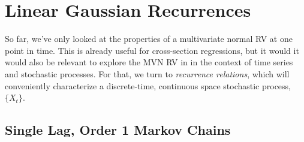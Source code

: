 \documentclass[12pt]{article}
\theoremstyle{plain}
\theoremstyle{definition}
\theoremstyle{remark}
\begin{document}





\section{Linear Gaussian Recurrences}

So far, we've only looked at the properties of a multivariate
normal RV at one point in time. This is already useful for
cross-section regressions, but it would
it would also be relevant to explore
the MVN RV in in the context of time series and stochastic
processes. For that, we turn
to \emph{recurrence relations}, which will conveniently characterize
a discrete-time, continuous space stochastic process,
$\{{X}_t\}$.

\subsection{Single Lag, Order 1 Markov Chains}
\end{document}
